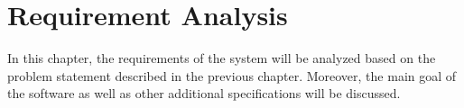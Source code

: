 \chapter{Requirement Analysis}

In this chapter, the requirements of the system will be analyzed based on the problem statement described in the previous chapter. Moreover, the main goal of the software as well as other additional specifications will be discussed. 




